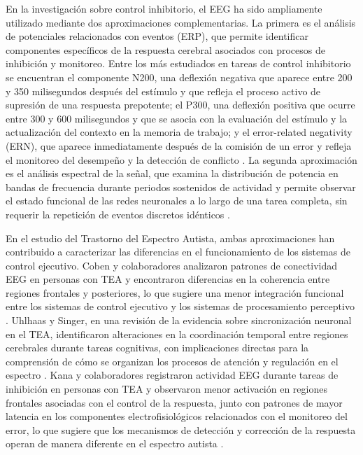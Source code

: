 \documentclass{book}
\begin{document}
En la investigación sobre control inhibitorio, el EEG 
ha sido ampliamente utilizado mediante dos aproximaciones 
complementarias. La primera es el análisis de potenciales 
relacionados con eventos (ERP), que permite identificar 
componentes específicos de la respuesta cerebral asociados 
con procesos de inhibición y monitoreo. Entre los más 
estudiados en tareas de control inhibitorio se encuentran 
el componente N200, una deflexión negativa que aparece 
entre 200 y 350 milisegundos después del estímulo y 
que refleja el proceso activo de supresión de una 
respuesta prepotente; el P300, una deflexión positiva 
que ocurre entre 300 y 600 milisegundos y que se asocia 
con la evaluación del estímulo y la actualización del 
contexto en la memoria de trabajo; y el error-related 
negativity (ERN), que aparece inmediatamente después 
de la comisión de un error y refleja el monitoreo del 
desempeño y la detección de conflicto \cite{Luck2014, 
Falkenstein2000, Kopp1996}. La segunda aproximación 
es el análisis espectral de la señal, que examina la 
distribución de potencia en bandas de frecuencia durante 
periodos sostenidos de actividad y permite observar el 
estado funcional de las redes neuronales a lo largo de 
una tarea completa, sin requerir la repetición de eventos 
discretos idénticos \cite{Klimesch1999}.

En el estudio del Trastorno del Espectro Autista, ambas 
aproximaciones han contribuido a caracterizar las 
diferencias en el funcionamiento de los sistemas de 
control ejecutivo. Coben y colaboradores analizaron 
patrones de conectividad EEG en personas con TEA y 
encontraron diferencias en la coherencia entre regiones 
frontales y posteriores, lo que sugiere una menor 
integración funcional entre los sistemas de control 
ejecutivo y los sistemas de procesamiento perceptivo 
\cite{Coben2008}. Uhlhaas y Singer, en una revisión 
de la evidencia sobre sincronización neuronal en el 
TEA, identificaron alteraciones en la coordinación 
temporal entre regiones cerebrales durante tareas 
cognitivas, con implicaciones directas para la 
comprensión de cómo se organizan los procesos de 
atención y regulación en el espectro \cite{Uhlhaas2006}. 
Kana y colaboradores registraron actividad EEG durante 
tareas de inhibición en personas con TEA y observaron 
menor activación en regiones frontales asociadas con 
el control de la respuesta, junto con patrones de 
mayor latencia en los componentes electrofisiológicos 
relacionados con el monitoreo del error, lo que 
sugiere que los mecanismos de detección y corrección 
de la respuesta operan de manera diferente en el 
espectro autista \cite{Kana2011}.
\end{document}
